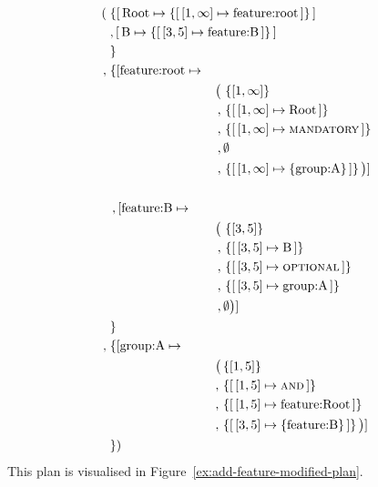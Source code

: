 \begin{align*}
  (&\; \{  \mapping{\text{Root}}{\set{\intervalmapping{1}{\forever}{\text{feature:root}}}} \\
    &\; ,  \mapping{\text{B}}{\set{\intervalmapping{3}{5}{\text{feature:B}}}} \\
    &\; \}\\
    ,&\; \{  [\text{feature:root} \mapsto \\
     & \hspace{3cm} \begin{aligned} \big(
          \, & \set{\interval{1}{\forever}} \\
       ,  \, & \set{\intervalmapping{1}{\forever}{\text{Root}}} \\
       ,  \, & \set{\intervalmapping{1}{\forever}{\mandatory}} \\
       ,  \, & \emptyset \\
     ,  \, & \set{\intervalmapping{1}{\forever}{\set{\text{group:A}}}} \big)] \\
   \end{aligned} \\
     &\\
    &\; \, , [\text{feature:B} \mapsto \\
    & \hspace{3cm} \begin{aligned} \big( 
          \, & \set{\interval{3}{5}} \\
       ,  \, & \set{\intervalmapping{3}{5}{\text{B}}} \\
       ,  \, & \set{\intervalmapping{3}{5}{\optional}} \\
       ,  \, & \set{\intervalmapping{3}{5}{\text{group:A}}} \\
     ,  \, & \emptyset \big)] \\
  \end{aligned}\\
   &\; \}\\ 
          ,& \; \{ [\text{group:A} \mapsto \\
            & \hspace{3cm} \begin{aligned} \big( 
                & \set{\interval{1}{5}} \\
                , \, & \set{\intervalmapping{1}{5}{\andtype}} \\
                , \, & \set{\intervalmapping{1}{5}{\text{feature:Root}}} \\
              , \, & \set{\intervalmapping{3}{5}{\set{\text{feature:B}}}} \big)] \\
            \end{aligned} \\
   &\; \})
\end{align*}
This plan is visualised in Figure~\ref{ex:add-feature-modified-plan}.

